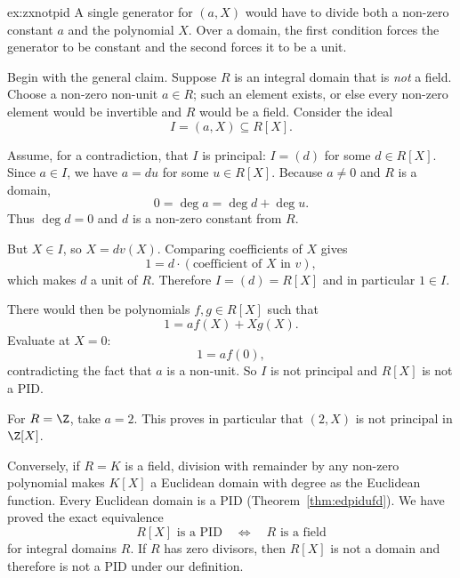 \begin{solution}{ex:zxnotpid}
\idea A single generator for $(a,X)$ would have to divide both a non-zero constant $a$ and the polynomial $X$. Over a domain, the first condition forces the generator to be constant and the second forces it to be a unit.

\writeup Begin with the general claim. Suppose $R$ is an integral domain that is \emph{not} a field. Choose a non-zero non-unit $a\in R$; such an element exists, or else every non-zero element would be invertible and $R$ would be a field. Consider the ideal
\[
I=(a,X)\subseteq R[X].
\]

Assume, for a contradiction, that $I$ is principal: $I=(d)$ for some $d\in R[X]$. Since $a\in I$, we have $a=du$ for some $u\in R[X]$. Because $a\ne0$ and $R$ is a domain,
\[
0=\deg a=\deg d+\deg u.
\]
Thus $\deg d=0$ and $d$ is a non-zero constant from $R$.

But $X\in I$, so $X=dv(X)$. Comparing coefficients of $X$ gives
\[
1=d\cdot(\text{coefficient of }X\text{ in }v),
\]
which makes $d$ a unit of $R$. Therefore $I=(d)=R[X]$ and in particular $1\in I$.

There would then be polynomials $f,g\in R[X]$ such that
\[
1=af(X)+Xg(X).
\]
Evaluate at $X=0$:
\[
1=af(0),
\]
contradicting the fact that $a$ is a non-unit. So $I$ is not principal and $R[X]$ is not a PID.

For $R=\Z$, take $a=2$. This proves in particular that $(2,X)$ is not principal in $\Z[X]$.

Conversely, if $R=K$ is a field, division with remainder by any non-zero polynomial makes $K[X]$ a Euclidean domain with degree as the Euclidean function. Every Euclidean domain is a PID (Theorem~\ref{thm:edpidufd}). We have proved the exact equivalence
\[
\boxed{R[X]\text{ is a PID}\quad\Longleftrightarrow\quad
R\text{ is a field}}
\]
for integral domains $R$. If $R$ has zero divisors, then $R[X]$ is not a domain and therefore is not a PID under our definition.
\end{solution}

